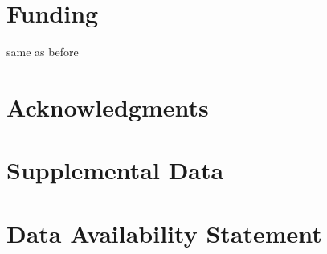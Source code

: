 \documentclass[utf8]{frontiersSCNS} %
\begin{document}
\section*{Funding}
same as before

\section*{Acknowledgments}

\section*{Supplemental Data}

\section*{Data Availability Statement}



\end{document}
